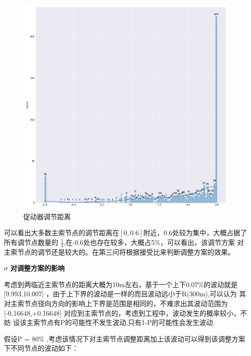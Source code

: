 \documentclass[withoutpreface,bwprint]{cumcmthesis} %
\begin{document}
  \begin{figure}[H]
    \centering
    \includegraphics[scale=0.3]{images/sta2r.png}
    \caption{促动器调节距离}
\end{figure}

可以看出大多数主索节点的调节距离在$[0,0.6]$附近，0.6处较为集中，大概占据了所有调节点数量的
$\frac{1}{3}$,在-0.6处也存在较多，大概占5\%，可以看出，该调节方案
对主索节点的调节还是较大的。在第三问将根据接受比来判断调整方案的效果。

\hspace*{\fill}

\hspace*{\fill}

\hspace*{\fill}


\textbf{ $\sigma$ 对调整方案的影响} 


考虑到两临近主索节点的距离大概为10m左右，基于一个上下0.07\%的波动就是[9.993,10.007] ，由于上下界的波动是一样的而且波动远小于R(300m),可以认为
其对主索节点径向方向的影响上下界是范围是相同的，不难求出其波动范围为[-0.16648,+0.16648] 对应到主索节点的，考虑到工程中，波动发生的概率较小，不妨
设该主索节点有P的可能性不发生波动,只有1-P的可能性会发生波动.

假设P = 80\% ,考虑该情况下对主索节点调整距离加上该波动可以得到该调整方案下不同节点的波动如下：
\end{document}
